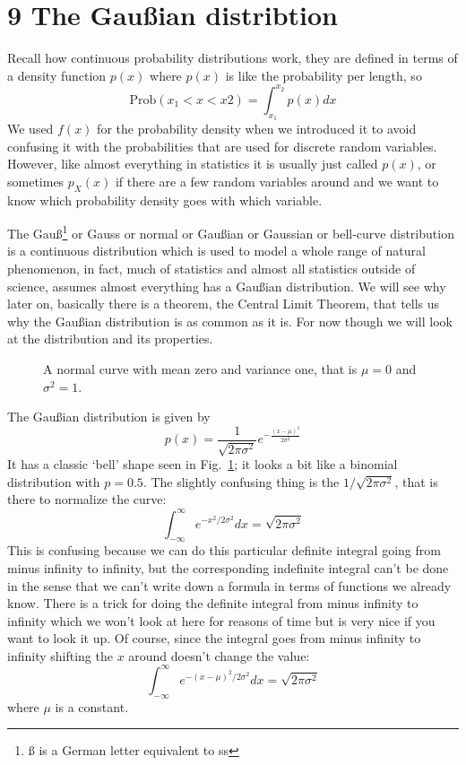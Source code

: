 \documentclass[11pt,a4paper]{scrartcl}
\begin{document}
\section*{9 The Gau\ss{}ian distribtion}

Recall how continuous probability distributions work, they are defined
in terms of a density function $p(x)$ where $p(x)$ is like the
probability per length, so 
\begin{equation}
\mbox{Prob}(x_1<x<x2)=\int_{x_1}^{x_2} p(x)dx
\end{equation}
We used $f(x)$ for the probability density when we introduced it to
avoid confusing it with the probabilities that are used for discrete
random variables. However, like almost everything in statistics it is
usually just called $p(x)$, or sometimes $p_X(x)$ if there are a few
random variables around and we want to know which probability density
goes with which variable.

The Gau\ss\footnote{\ss{} is a German letter equivalent to ss} or Gauss
or normal or Gau\ss{}ian or Gaussian or bell-curve distribution is a
continuous distribution which is used to model a whole range of
natural phenomenon, in fact, much of statistics and almost all
statistics outside of science, assumes almost everything has a
Gau\ss{}ian distribution. We will see why later on, basically there is
a theorem, the Central Limit Theorem, that tells us why the
Gau\ss{}ian distribution is as common as it is. For now though we will
look at the distribution and its properties.

\begin{figure}[tb]
\begin{center}

\end{center}
\caption{A normal curve with mean zero and variance one, that is $\mu=0$ and $\sigma^2=1$.\label{fig_gauss}}
\end{figure}

The Gau\ss{}ian distribution is given by
\begin{equation}
p(x)=\frac{1}{\sqrt{2\pi\sigma^2}}e^{-\frac{(x-\mu)^2}{2\sigma^2}}
\end{equation}
It has a classic \lq{}bell\rq{} shape seen in Fig.~\ref{fig_gauss}; it
looks a bit like a binomial distribution with $p=0.5$. The slightly
confusing thing is the $1/\sqrt{2\pi\sigma^2}$, that is there to normalize the curve:
\begin{equation}
\int_{-\infty}^\infty e^{-x^2/2\sigma^2}dx=\sqrt{2\pi\sigma^2}
\end{equation}
This is confusing because we can do this particular definite integral
going from minus infinity to infinity, but the corresponding
indefinite integral can't be done in the sense that we can't write
down a formula in terms of functions we already know. There is a trick
for doing the definite integral from minus infinity to infinity which
we won't look at here for reasons of time but is very nice if you want
to look it up. Of course, since the integral goes from minus infinity
to infinity shifting the $x$ around doesn't change the value:
\begin{equation}
\int_{-\infty}^\infty e^{-(x-\mu)^2/2\sigma^2}dx=\sqrt{2\pi\sigma^2}
\end{equation}
where $\mu$ is a constant.
\end{document}
